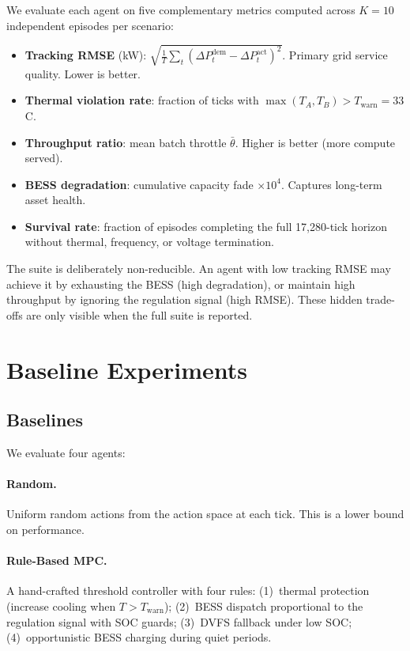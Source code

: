 \documentclass{article}
\newcommand{\deltap}{\Delta P}
\begin{document}
We evaluate each agent on five complementary metrics computed across
$K = 10$ independent episodes per scenario:

\begin{itemize}[leftmargin=*, itemsep=2pt]
  \item \textbf{Tracking RMSE} (kW):
        $\sqrt{\frac{1}{T}\sum_t(\deltap_t^{\text{dem}} - \deltap_t^{\text{act}})^2}$.
        Primary grid service quality. Lower is better.
  \item \textbf{Thermal violation rate}: fraction of ticks with
        $\max(T_A, T_B) > T_{\text{warn}} = 33$\textdegree C.
  \item \textbf{Throughput ratio}: mean batch throttle $\bar{\theta}$.
        Higher is better (more compute served).
  \item \textbf{BESS degradation}: cumulative capacity fade $\times 10^4$.
        Captures long-term asset health.
  \item \textbf{Survival rate}: fraction of episodes completing the full
        17,280-tick horizon without thermal, frequency, or voltage termination.
\end{itemize}

The suite is deliberately non-reducible.
An agent with low tracking RMSE may achieve it by exhausting the BESS
(high degradation), or maintain high throughput by ignoring the regulation
signal (high RMSE).
These hidden trade-offs are only visible when the full suite is reported.

\section{Baseline Experiments}
\label{sec:experiments}

\subsection{Baselines}
\label{sec:baselines}

We evaluate four agents:

\paragraph{Random.}
Uniform random actions from the action space at each tick.
This is a lower bound on performance.

\paragraph{Rule-Based MPC.}
A hand-crafted threshold controller with four rules:
(1)~thermal protection (increase cooling when $T > T_{\text{warn}}$);
(2)~BESS dispatch proportional to the regulation signal with SOC guards;
(3)~DVFS fallback under low SOC;
(4)~opportunistic BESS charging during quiet periods.
\end{document}
